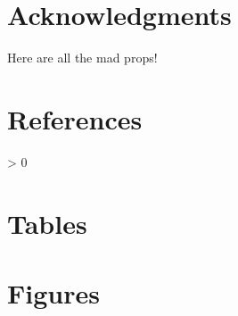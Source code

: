 \documentclass[11pt,
  english,
  a4paper,
]{article}
\newlength{\cslhangindent}
\newenvironment{CSLReferences}[2] %
 {%
  \setlength{\parindent}{0pt}
  \ifodd #1 \everypar{\setlength{\hangindent}{\cslhangindent}}\ignorespaces\fi
  \ifnum #2 > 0
  \setlength{\parskip}{#2\baselineskip}
  \fi
 }%
 {}
\begin{document}

\hypertarget{acknowledgments}{%
\section{Acknowledgments}\label{acknowledgments}}

\leavevmode\tagmcend\tagstructend


Here are all the mad props!

\leavevmode\tagmcend\tagstructend\par

\clearpage


\hypertarget{references}{%
\section{References}\label{references}}

\leavevmode\tagmcend\tagstructend


\hypertarget{refs}{}
\begin{CSLReferences}{0}{0}
\end{CSLReferences}

\leavevmode\tagmcend\tagstructend

\clearpage


\hypertarget{tables}{%
\section{Tables}\label{tables}}

\leavevmode\tagmcend\tagstructend

\clearpage


\hypertarget{figures}{%
\section{Figures}\label{figures}}

\leavevmode\tagmcend\tagstructend

\clearpage

\end{document}
